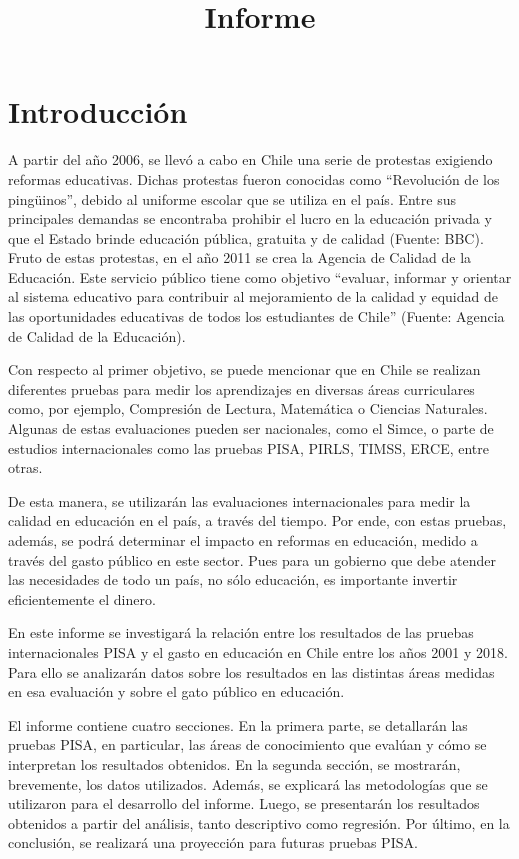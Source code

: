 \documentclass[
]{article}
\title{Informe}
\author{}
\date{\vspace{-2.5em}}
\begin{document}
\maketitle

\hypertarget{introducciuxf3n}{%
\section{Introducción}\label{introducciuxf3n}}

A partir del año 2006, se llevó a cabo en Chile una serie de protestas
exigiendo reformas educativas. Dichas protestas fueron conocidas como
``Revolución de los pingüinos'', debido al uniforme escolar que se
utiliza en el país. Entre sus principales demandas se encontraba
prohibir el lucro en la educación privada y que el Estado brinde
educación pública, gratuita y de calidad (Fuente: BBC). Fruto de estas
protestas, en el año 2011 se crea la Agencia de Calidad de la Educación.
Este servicio público tiene como objetivo ``evaluar, informar y orientar
al sistema educativo para contribuir al mejoramiento de la calidad y
equidad de las oportunidades educativas de todos los estudiantes de
Chile'' (Fuente: Agencia de Calidad de la Educación).

Con respecto al primer objetivo, se puede mencionar que en Chile se
realizan diferentes pruebas para medir los aprendizajes en diversas
áreas curriculares como, por ejemplo, Compresión de Lectura, Matemática
o Ciencias Naturales. Algunas de estas evaluaciones pueden ser
nacionales, como el Simce, o parte de estudios internacionales como las
pruebas PISA, PIRLS, TIMSS, ERCE, entre otras.

De esta manera, se utilizarán las evaluaciones internacionales para
medir la calidad en educación en el país, a través del tiempo. Por ende,
con estas pruebas, además, se podrá determinar el impacto en reformas en
educación, medido a través del gasto público en este sector. Pues para
un gobierno que debe atender las necesidades de todo un país, no sólo
educación, es importante invertir eficientemente el dinero.

En este informe se investigará la relación entre los resultados de las
pruebas internacionales PISA y el gasto en educación en Chile entre los
años 2001 y 2018. Para ello se analizarán datos sobre los resultados en
las distintas áreas medidas en esa evaluación y sobre el gato público en
educación.

El informe contiene cuatro secciones. En la primera parte, se detallarán
las pruebas PISA, en particular, las áreas de conocimiento que evalúan y
cómo se interpretan los resultados obtenidos. En la segunda sección, se
mostrarán, brevemente, los datos utilizados. Además, se explicará las
metodologías que se utilizaron para el desarrollo del informe. Luego, se
presentarán los resultados obtenidos a partir del análisis, tanto
descriptivo como regresión. Por último, en la conclusión, se realizará
una proyección para futuras pruebas PISA.
\end{document}
